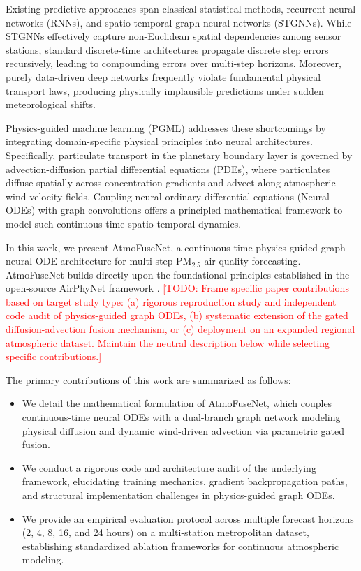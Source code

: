 \documentclass[conference]{IEEEtran}
\begin{document}
Existing predictive approaches span classical statistical methods, recurrent neural networks (RNNs), and spatio-temporal graph neural networks (STGNNs). While STGNNs effectively capture non-Euclidean spatial dependencies among sensor stations, standard discrete-time architectures propagate discrete step errors recursively, leading to compounding errors over multi-step horizons. Moreover, purely data-driven deep networks frequently violate fundamental physical transport laws, producing physically implausible predictions under sudden meteorological shifts.

Physics-guided machine learning (PGML) addresses these shortcomings by integrating domain-specific physical principles into neural architectures. Specifically, particulate transport in the planetary boundary layer is governed by advection-diffusion partial differential equations (PDEs), where particulates diffuse spatially across concentration gradients and advect along atmospheric wind velocity fields. Coupling neural ordinary differential equations (Neural ODEs) \cite{chen2018neuralode} with graph convolutions offers a principled mathematical framework to model such continuous-time spatio-temporal dynamics.

In this work, we present AtmoFuseNet, a continuous-time physics-guided graph neural ODE architecture for multi-step $\text{PM}_{2.5}$ air quality forecasting. AtmoFuseNet builds directly upon the foundational principles established in the open-source AirPhyNet framework \cite{hettige2024airphynet}. 
\textcolor{red}{[TODO: Frame specific paper contributions based on target study type: (a) rigorous reproduction study and independent code audit of physics-guided graph ODEs, (b) systematic extension of the gated diffusion-advection fusion mechanism, or (c) deployment on an expanded regional atmospheric dataset. Maintain the neutral description below while selecting specific contributions.]}

The primary contributions of this work are summarized as follows:
\begin{itemize}
    \item We detail the mathematical formulation of AtmoFuseNet, which couples continuous-time neural ODEs with a dual-branch graph network modeling physical diffusion and dynamic wind-driven advection via parametric gated fusion.
    \item We conduct a rigorous code and architecture audit of the underlying framework, elucidating training mechanics, gradient backpropagation paths, and structural implementation challenges in physics-guided graph ODEs.
    \item We provide an empirical evaluation protocol across multiple forecast horizons (2, 4, 8, 16, and 24 hours) on a multi-station metropolitan dataset, establishing standardized ablation frameworks for continuous atmospheric modeling.
\end{itemize}
\end{document}
